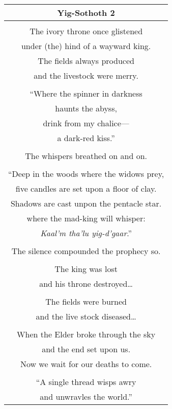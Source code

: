 \documentclass{article}
\begin{document}
\begin{center}
\begin{tabular}{c}
\textbf{Yig-Sothoth 2} \\ \hline
\\
The ivory throne once glistened \\
under (the) hind of a wayward king. \\
The fields always produced \\
and the livestock were merry. \\
\\
``Where the spinner in darkness \\
haunts the abyss, \\
drink from my chalice--- \\
a dark-red kiss.'' \\
\\
The whispers breathed on and on. \\
\\
``Deep in the woods where the widows prey, \\
five candles are set upon a floor of clay. \\
Shadows are cast unpon the pentacle star. \\
where the mad-king will whisper: \\
\textit{Kaal'm tha'lu yig-d'gaar}.'' \\
\\
The silence compounded the prophecy so. \\
\\
The king was lost \\
and his throne destroyed\ldots{} \\
\\
The fields were burned \\
and the live stock diseased\ldots{} \\
\\
When the Elder broke through the sky \\
and the end set upon us.
\\
Now we wait for our deaths to come. \\
\\
``A single thread wisps awry \\
and unwravles the world.'' \\
\end{tabular}
\end{center}
\end{document}

